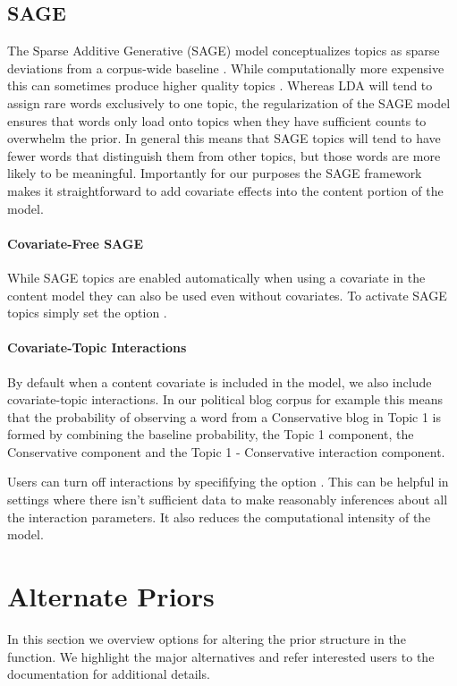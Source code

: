 \documentclass[nojss]{jss}
\begin{document}
\subsection{SAGE}
The Sparse Additive Generative (SAGE) model conceptualizes topics as sparse deviations from a corpus-wide baseline \citep{eisenstein2011sparse}.  While computationally more expensive this can sometimes produce higher quality topics .  Whereas LDA will tend to assign rare words exclusively to one topic, the regularization of the SAGE model ensures that words only load onto topics when they have sufficient counts to overwhelm the prior.  In general this means that SAGE topics will tend to have fewer words that distinguish them from other topics, but those words are more likely to be meaningful.  Importantly for our purposes the SAGE framework makes it straightforward to add covariate effects into the content portion of the model. 

\paragraph{Covariate-Free SAGE}
While SAGE topics are enabled automatically when using a covariate in the content model they can also be used even without covariates.  To activate SAGE topics simply set the option .

\paragraph{Covariate-Topic Interactions}
By default when a content covariate is included in the model, we also include covariate-topic interactions.  In our political blog corpus for example this means that the probability of observing a word from a Conservative blog in Topic 1 is formed by combining the baseline probability, the Topic 1 component, the Conservative component and the Topic 1 - Conservative interaction component.

Users can turn off interactions by specififying the option .  This can be helpful in settings where there isn't sufficient data to make reasonably inferences about all the interaction parameters.  It also reduces the computational intensity of the model.

\section{Alternate Priors}
In this section we overview options for altering the prior structure in the   function.  We highlight the major alternatives and refer interested users to the documentation for additional details.
\end{document}
